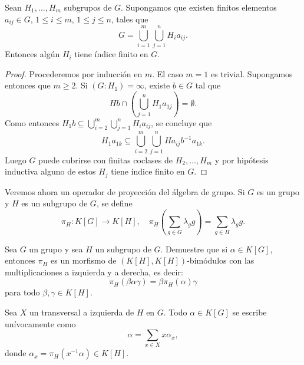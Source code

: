 \begin{lemma}[Neumann]
	\label{lem:Neumann}
	Sean $H_1,\dots,H_m$ subgrupos de $G$. Supongamos que existen finitos elementos 
	$a_{ij}\in G$, $1\leq i\leq m$, $1\leq j\leq n$, tales que 
	\[
		G=\bigcup_{i=1}^m\bigcup_{j=1}^n H_ia_{ij}.
	\]
	Entonces algún $H_i$ tiene índice finito en $G$.
\end{lemma}

\begin{proof}
	Procederemos por inducción en $m$. El caso $m=1$ es trivial. Supongamos
	entonces que $m\geq2$. Si $(G:H_1)=\infty$, existe $b\in G$ tal que 
	\[
		Hb\cap\left(
	\bigcup_{j=1}^nH_1a_{1j}\right)=\emptyset.
	\]
	Como entonces $H_1b\subseteq\bigcup_{i=2}^m\bigcup_{j=1}^n H_ia_{ij}$, se concluye que
	\[
		H_1a_{1k}\subseteq \bigcup_{i=2}^m\bigcup_{j=1}^n Ha_{ij}b^{-1}a_{1k}.
	\]
	Luego $G$ puede cubrirse con finitas coclases de $H_2,\dots,H_m$ y por hipótesis inductiva 
	alguno de estos $H_j$ tiene índice finito en $G$.
\end{proof}

Veremos ahora un operador de proyección del álgebra de grupo. Si $G$ es un
grupo y $H$ es un subgrupo de $G$, se define
\[
	\pi_H\colon K[G]\to K[H],\quad
	\pi_H\left(\sum_{g\in G}\lambda_gg\right)=\sum_{g\in H}\lambda_gg.
\]

\begin{exercise}
	Sea $G$ un grupo y sea $H$ un subgrupo de $G$. Demuestre que si $\alpha\in
	K[G]$, entonces $\pi_H$ es un morfismo de $(K[H],K[H])$-bimódulos con las
	multiplicaciones a izquierda y a derecha, es decir:
	\[
		\pi_H(\beta\alpha\gamma)=\beta\pi_H(\alpha)\gamma
	\]
	para todo 
	$\beta,\gamma\in K[H]$.
\end{exercise}


\begin{lemma}
	\label{lem:escritura}
	Sea $X$ un transversal a izquierda de $H$ en $G$. Todo $\alpha\in K[G]$ se
	escribe unívocamente como 
	\[
	\alpha=\sum_{x\in X}x\alpha_x,
	\]
	donde $\alpha_x=\pi_H(x^{-1}\alpha)\in K[H]$.
\end{lemma}

